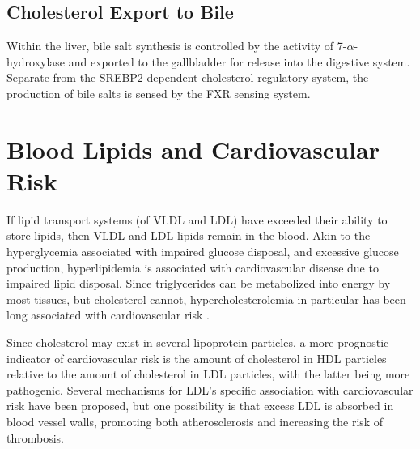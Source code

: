 \documentclass{tufte-handout}
\begin{document}
\subsection{Cholesterol Export to Bile}

Within the liver, bile salt synthesis is controlled by the activity of 7-$\alpha$-hydroxylase and exported to the gallbladder for release into the digestive system.  Separate from the SREBP2-dependent cholesterol regulatory system, the production of bile salts is sensed by the FXR sensing system.

\section{Blood Lipids and Cardiovascular Risk}

If lipid transport systems (of VLDL and LDL) have exceeded their ability to store lipids, then VLDL and LDL lipids remain in the blood.  Akin to the hyperglycemia associated with impaired glucose disposal, and excessive glucose production, hyperlipidemia is associated with cardiovascular disease due to impaired lipid disposal.  Since triglycerides can be metabolized into energy by most tissues, but cholesterol cannot, hypercholesterolemia in particular has been long associated with cardiovascular risk \citep{Keys1963}.

Since cholesterol may exist in several lipoprotein particles, a more prognostic indicator of cardiovascular risk is the amount of cholesterol in HDL particles relative to the amount of cholesterol in LDL particles, with the latter being more pathogenic.  Several mechanisms for LDL's specific association with cardiovascular risk have been proposed, but one possibility is that excess LDL is absorbed in blood vessel walls, promoting both atherosclerosis and increasing the risk of thrombosis.
\end{document}
